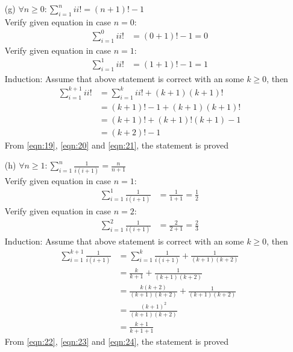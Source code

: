 \begin{enumerate}
    \newpage
    \item[(g)] $\forall n\geq 0: \displaystyle\sum^{n}_{i=1} ii! = (n+1)!-1$ \\
        Verify given equation in case $n=0$:
            \begin{align}
                \displaystyle\sum^{0}_{i=1} ii! &= (0+1)!-1 = 0 \label{eqn:19}
            \end{align}
        Verify given equation in case $n=1$:
            \begin{align}
                \displaystyle\sum^{1}_{i=1} ii! &= (1+1)!-1 = 1 \label{eqn:20}
            \end{align}
        Induction: Assume that above statement is correct with an some $k \geq 0$, then\\
        \begin{align}
            \displaystyle\sum^{k+1}_{i=1} ii! &= \displaystyle\sum^{k}_{i=1} ii! + (k+1)(k+1)! \\
                                            &= (k+1)!-1 + (k+1)(k+1)! \\
                                            &= (k+1)! + (k+1)!(k+1) -1 \\
                                            &= (k+2)! - 1 \label{eqn:21}
        \end{align}
        From \ref{eqn:19}, \ref{eqn:20} and \ref{eqn:21}, the statement is proved
    
    \item[(h)] $\forall n\geq 1: \displaystyle\sum^{n}_{i=1} \frac{1}{i(i+1)} = \frac{n}{n+1}$ \\
    Verify given equation in case $n=1$:
        \begin{align}
            \displaystyle\sum^{1}_{i=1} \frac{1}{i(i+1)} &= \frac{1}{1+1} = \frac{1}{2} \label{eqn:23}
        \end{align}
    Verify given equation in case $n=2$:
        \begin{align}
            \displaystyle\sum^{2}_{i=1} \frac{1}{i(i+1)} &= \frac{2}{2+1} = \frac{2}{3} \label{eqn:23}
        \end{align}
    Induction: Assume that above statement is correct with an some $k \geq 0$, then\\
    \begin{align}
        \displaystyle\sum^{k+1}_{i=1} \frac{1}{i(i+1)} &= \displaystyle\sum^{k}_{i=1} \frac{1}{i(i+1)} + \frac{1}{(k+1)(k+2)} \\
                                        &= \frac{k}{k+1} + \frac{1}{(k+1)(k+2)} \\
                                        &= \frac{k(k+2)}{(k+1)(k+2)} + \frac{1}{(k+1)(k+2)} \\
                                        &= \frac{(k+1)^2}{(k+1)(k+2)} \\
                                        &= \frac{k+1}{k+1+1} \label{eqn:24}
    \end{align}
    From \ref{eqn:22}, \ref{eqn:23} and \ref{eqn:24}, the statement is proved
    

\end{enumerate}

